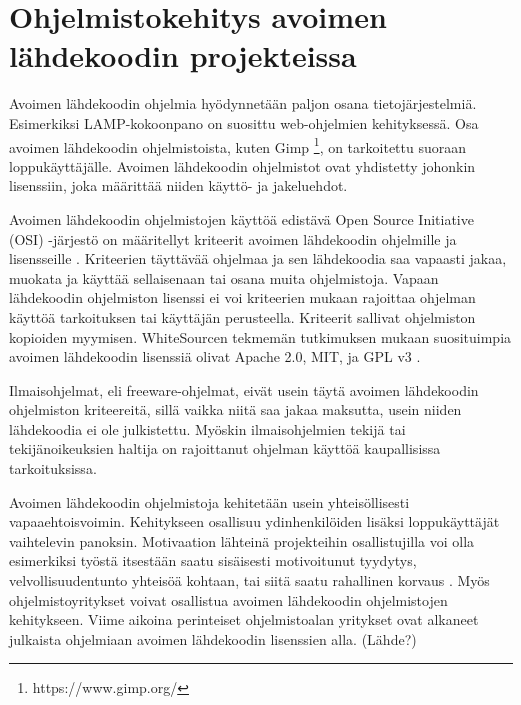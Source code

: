 \documentclass[utf8]{gradu3}
\begin{document}

\chapter{Ohjelmistokehitys avoimen lähdekoodin projekteissa}
Avoimen lähdekoodin ohjelmia hyödynnetään paljon osana tietojärjestelmiä.
Esimerkiksi LAMP-kokoonpano on suosittu web-ohjelmien kehityksessä. Osa avoimen
lähdekoodin ohjelmistoista, kuten Gimp \footnote{https://www.gimp.org/}, on
tarkoitettu suoraan loppukäyttäjälle. Avoimen lähdekoodin ohjelmistot ovat
yhdistetty johonkin lisenssiin, joka määrittää niiden käyttö- ja jakeluehdot.

Avoimen lähdekoodin ohjelmistojen käyttöä edistävä Open Source Initiative (OSI)
-järjestö on määritellyt kriteerit avoimen lähdekoodin ohjelmille ja
lisensseille \parencite{Osd}. Kriteerien täyttävää ohjelmaa ja sen lähdekoodia
saa vapaasti jakaa, muokata ja käyttää sellaisenaan tai osana muita
ohjelmistoja. Vapaan lähdekoodin ohjelmiston lisenssi ei voi kriteerien mukaan
rajoittaa ohjelman käyttöä tarkoituksen tai käyttäjän perusteella. Kriteerit
sallivat ohjelmiston kopioiden myymisen. WhiteSourcen tekmemän tutkimuksen
mukaan suosituimpia avoimen lähdekoodin lisenssiä olivat Apache 2.0, MIT, ja GPL
v3 \parencite{Whitesource-2021}.

Ilmaisohjelmat, eli freeware-ohjelmat, eivät usein täytä avoimen lähdekoodin
ohjelmiston kriteereitä, sillä vaikka niitä saa jakaa maksutta, usein niiden
lähdekoodia ei ole julkistettu. Myöskin ilmaisohjelmien tekijä tai
tekijänoikeuksien haltija on rajoittanut ohjelman käyttöä kaupallisissa
tarkoituksissa.
\parencite{Corbly-2014}

Avoimen lähdekoodin ohjelmistoja kehitetään usein yhteisöllisesti
vapaaehtoisvoimin. Kehitykseen osallisuu ydinhenkilöiden lisäksi loppukäyttäjät
vaihtelevin panoksin. Motivaation lähteinä projekteihin osallistujilla voi olla
esimerkiksi työstä itsestään saatu sisäisesti motivoitunut tyydytys,
velvollisuudentunto yhteisöä kohtaan, tai siitä saatu rahallinen korvaus
\parencite{Lakhani-2005}. Myös ohjelmistoyritykset voivat osallistua avoimen
lähdekoodin ohjelmistojen kehitykseen. Viime aikoina perinteiset ohjelmistoalan
yritykset ovat alkaneet julkaista ohjelmiaan avoimen lähdekoodin lisenssien
alla. (Lähde?)
\end{document}
